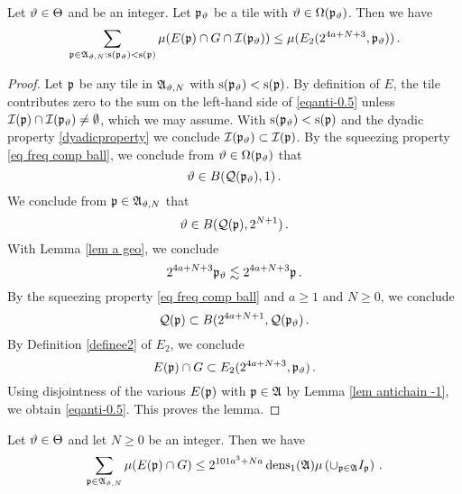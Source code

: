\begin{lemma}\label{lem antichain-.5}
Let $\vartheta\in\Theta$ and  be
an integer. Let $\mathfrak p_{\vartheta}$ be a tile with $\vartheta\in \Omega(\mathfrak p_{\vartheta})$.
Then we have
\begin{equation}\label{eqanti-0.5}
    \sum_{\mathfrak p\in\mathfrak{A}_{\vartheta,N}: \mathrm{s}(\mathfrak p_{\vartheta})<\mathrm{s}(\mathfrak p)}\mu(E(\mathfrak p)\cap G \cap \mathcal{I}(\mathfrak p_{\vartheta}))
    \le  \mu (E_2(2^{4a+N+3},\mathfrak p_{\vartheta}))
    \, .
\end{equation}



\end{lemma}

\begin{proof}


Let $\mathfrak p$ be any tile in $\mathfrak{A}_{\vartheta,N}$ with $\mathrm{s}(\mathfrak p_{\vartheta})<\mathrm{s}(\mathfrak p)$. By definition of
$E$, the tile contributes zero to the sum on the left-hand side of \eqref{eqanti-0.5} unless
    $\mathcal{I}(\mathfrak p)\cap \mathcal{I}(\mathfrak p_{\vartheta}) \neq \emptyset$, which we may assume. With $\mathrm{s}(\mathfrak p_{\vartheta})<\mathrm{s}(\mathfrak p)$
and the dyadic property
\eqref{dyadicproperty} we conclude $\mathcal{I}(\mathfrak p_{\vartheta})\subset  \mathcal{I}(\mathfrak p)$.
By the squeezing property
\eqref{eq freq comp ball},
we conclude from
$\vartheta\in \Omega(\mathfrak p_{\vartheta})$
that
\begin{equation}
    \vartheta\in B(\mathcal{Q}(\mathfrak p_{\vartheta}), 1)\, .
\end{equation}
We conclude from $\mathfrak p \in \mathfrak{A}_{\vartheta,N}$ that
\begin{equation}
    \vartheta \in B(\mathcal{Q}(\mathfrak p), 2^{N+1})\, .
\end{equation}
With Lemma \ref{lem a geo}, we conclude
    \begin{equation}
        2^{4a+N+3}\mathfrak p_{\vartheta}  \lesssim  2^{4a+N+3}\mathfrak p \, .
    \end{equation}
By the squeezing property \eqref{eq freq comp ball}
and $a\ge 1$ and $N\ge 0$, we conclude
\begin{equation}
    \mathcal{Q}(\mathfrak p)\subset B(2^{4a+N+1}, \mathcal{Q}(\mathfrak p_{\vartheta})\, .
\end{equation}
By Definition \eqref{definee2} of $E_2$,
    we conclude
\begin{equation}
E(\mathfrak p)\cap G \subset E_2(2^{4a+N+3},\mathfrak p_{\vartheta})\, .
\end{equation}
Using disjointness of the various $E(\mathfrak p)$ with $\mathfrak p\in \mathfrak{A}$  by Lemma \ref{lem antichain -1}, we obtain \eqref{eqanti-0.5}.
This proves the lemma.
\end{proof}
\begin{lemma}
\label{lem antichain 0}
Let $\vartheta\in\Theta$ and let $N\ge 0$  be
an integer. Then we have
\begin{equation}\label{eqanti00}
    \sum_{\mathfrak p\in\mathfrak{A}_{\vartheta,N}}\mu(E(\mathfrak p)\cap G)
    \le
    2^{101a^3+Na}\operatorname{\operatorname{dens}}_1(\mathfrak{A})\mu\left(\cup_{\mathfrak p\in\mathfrak{A}}I_{\mathfrak p}\right)\, .
\end{equation}
\end{lemma}




